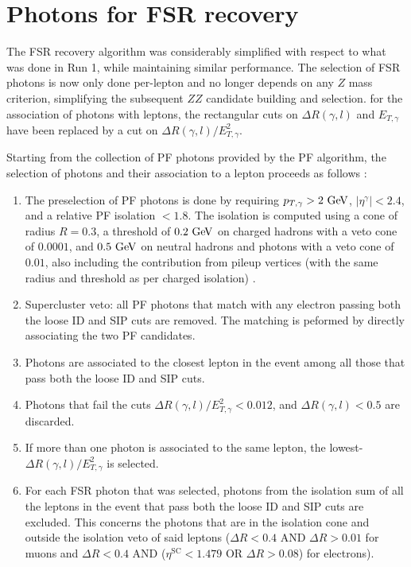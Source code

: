 \section{Photons for FSR recovery}
\label{sec:FSRphotons}

The FSR recovery algorithm was considerably simplified with respect to what was done in Run 1, while maintaining similar performance. 
The selection of FSR photons is now only done per-lepton and no longer depends on any $Z$ mass criterion, simplifying the subsequent $ZZ$ candidate building and selection. for the association of photons with leptons, the rectangular cuts on $\Delta R(\gamma,l)$ and $E_{T,\gamma}$  have been replaced by a cut on $\Delta R(\gamma,l)/E_{T,\gamma}^{2}$.

Starting from the collection of PF photons provided by the PF algorithm, the selection of photons and their association to a lepton proceeds as follows \cite{AN-15-277, AN-16-217}:

\begin{enumerate}
\item The preselection of PF photons is done by requiring $p_{T,\gamma} > 2~\mathrm{Ge\kern -0.1em V}$, $|\eta^{\gamma}| < 2.4$, and a relative PF isolation $<1.8$. The isolation is computed using a cone of radius $R=0.3$, a threshold of $0.2~\mathrm{Ge\kern -0.1em V}$ on charged hadrons with a veto cone of $0.0001$, and $0.5~\mathrm{Ge\kern -0.1em V}$ on neutral hadrons and photons with a veto cone of $0.01$, also including the contribution from pileup vertices (with the same radius and threshold as per charged isolation) .
\item Supercluster veto: all PF photons that match with any electron passing both the loose ID and SIP cuts are removed. The matching is peformed by directly associating the two PF candidates.
\item Photons are associated to the closest lepton in the event among all those that pass both the loose ID and SIP cuts.
\item Photons that fail the cuts $\Delta R(\gamma,l)/E_{T,\gamma}^2 < 0.012$, and $\Delta R(\gamma,l)<0.5$ are discarded.
\item If more than one photon is associated to the same lepton, the lowest-$\Delta R(\gamma,l)/E_{T,\gamma}^2$ is selected.
\item For each FSR photon that was selected, photons from the isolation sum of all the leptons in the event that pass both the loose ID and SIP cuts are excluded. This concerns the photons that are in the isolation cone and outside the isolation veto of said leptons ($\Delta R < 0.4$ AND $\Delta R > 0.01$ for muons and $\Delta R < 0.4$ AND ($\eta^{\text{SC}} < 1.479$ OR $\Delta R > 0.08$) for electrons).
\end{enumerate}

